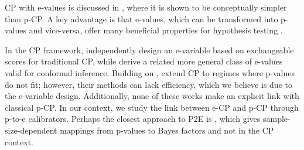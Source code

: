 \documentclass{article}
\theoremstyle{plain}
\theoremstyle{definition}
\theoremstyle{remark}
\begin{document}

CP with e-values is discussed in \citet{vovk2025econformal}, where it is shown to be conceptually simpler than p-CP. A key advantage is that e-values, which can be transformed into p-values and vice-versa, offer many beneficial properties for hypothesis testing \citep{evaluespoly,vovk2021values,vovk2024merging,wang2025only}.


In the CP framework, \citep{balinsky2024} independently design an e\mbox{-}variable based on exchangeable scores for traditional CP, while \citet{koningCP} derive a related more general class of e\mbox{-}values valid for conformal inference. Building on \citep{balinsky2024}, \citet{gauthier2025values,gauthier2025backward} extend CP to regimes where p-values do not fit; however, their methods can lack efficiency, which we believe is due to the e-variable design. Additionally, none of these works make an explicit link with classical p-CP. In our context, we  study the link between e-CP and p-CP through p-to-e calibrators.  Perhaps the closest approach to P2E is \citep{bickel2025small}, which gives sample\mbox{-}size\mbox{-}dependent mappings from p\mbox{-}values to Bayes factors and not in the CP context. 
\end{document}
